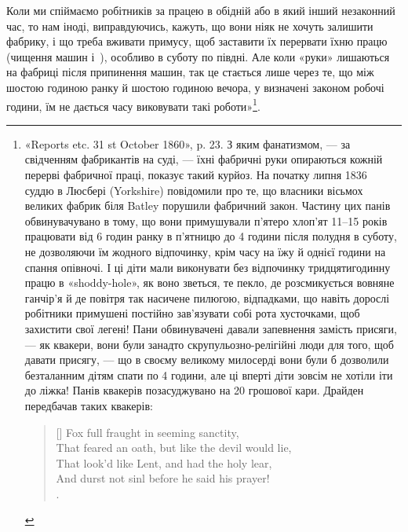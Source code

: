 Коли ми спіймаємо робітників за працею в обідній або в який
інший незаконний час, то нам іноді, виправдуючись, кажуть,
що вони ніяк не хочуть залишити фабрику, і що треба вживати
примусу, щоб заставити їх перервати їхню працю (чищення машин
і~), особливо в суботу по півдні. Але коли «руки» лишаються
на фабриці після припинення машин, так це стається лише
через те, що між шостою годиною ранку й шостою годиною вечора,
у визначені законом робочі години, їм не дається часу виковувати
такі роботи»\footnote{
«Reports etc. 31 st October 1860», p. 23. З яким фанатизмом, — за
свідченням фабрикантів на суді, — їхні фабричні руки опираються кожній
перерві фабричної праці, показує такий курйоз. На початку липня 1836~
суддю в Люсбері (Yorkshire) повідомили про те, що власники вісьмох великих
фабрик біля Batley порушили фабричний закон. Частину цих панів
обвинувачувано в тому, що вони примушували п’ятеро хлоп’ят 11--15 років
працювати від 6 годин ранку в п’ятницю до 4 години після полудня
в суботу, не дозволяючи їм жодного відпочинку, крім часу на їжу й однієї
години на спання опівночі. І ці діти мали виконувати без відпочинку тридцятигодинну
працю в «shoddy-hole», як воно зветься, те пекло, де розсмикується
вовняне ганчір’я й де повітря так насичене пилюгою, відпадками,
що навіть дорослі робітники примушені постійно зав’язувати собі рота
хусточками, щоб захистити свої легені! Пани обвинувачені давали запевнення
замість присяги, — як квакери, вони були занадто скрупульозно-релігійні
люди для того, щоб давати присягу, — що в своєму великому
милосерді вони були б дозволили безталанним дітям спати по 4 години,
але ці вперті діти зовсім не хотіли іти до ліжка! Панів квакерів
позасуджувано на 20 грошової кари. Драйден передбачав
таких квакерів:
\settowidth{\versewidth}{That feared an oath, but like the devil would lie,} 
\begin{verse}[\versewidth]
Fox full fraught in seeming sanctity,\\
That feared an oath, but like the devil would lie,\\
That look’d like Lent, and had the holy lear,\\
And durst not sinl before he said his prayer! \\
.\\
\end{verse}
}.

